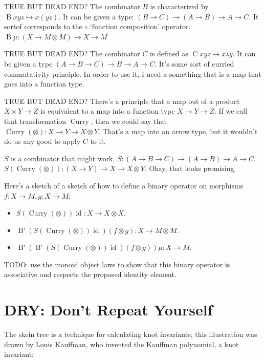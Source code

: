 \documentclass[a4paper]{article}
\begin{document}
TRUE BUT DEAD END? The combinator \(B\) is characterized by \(\mathop{B} x y z \mapsto x (y z)\). 
It can be given a type: \((B \to C) \to (A \to B) \to A \to C\). It sortof corresponds to the \(\circ\) `function composition' operator. \(\mathop{B} \mu : (X \to M \otimes M) \to X \to M\)

TRUE BUT DEAD END? The combinator \(C\) is defined as \(\mathop{C} x y z \mapsto x z y\).
It can be given a type \((A \to B \to C) \to B \to A \to C\). It's some sort of curried commutativity principle. In order to use it, I need a something that is a map that goes into a function type.

TRUE BUT DEAD END? There's a principle that a map out of a product \(X \times Y \to Z\) is equivalent to a map into a function type \(X \to Y \to Z\). If we call that transformation \(\mathop{Curry}\),
then we could say that \( \mathop{Curry} (\otimes) : X \to Y \to X \otimes Y \). That's a map into an arrow type, but it wouldn't do us any good to apply \(C\) to it.

\(S\) is a combinator that might work. \( S : (A \to B \to C) \to (A \to B) \to A \to C\). 
\(S (\mathop{Curry} (\otimes)) : (X \to Y) \to X \to X \otimes Y\). Okay, that looks promising. 

Here's a sketch of a sketch of how to define a binary operator on morphisms \(f : X \to M, g : X \to M\):
\begin{itemize}
    \item \(S (\mathop{Curry} (\otimes)) \mathop{id} : X \to X \otimes X\).
    \item \( \mathop{B'} (S (\mathop{Curry} (\otimes)) \mathop{id}) (f \otimes g) : X \to M \otimes M\).
    \item \( \mathop{B'} (\mathop{B'} (S (\mathop{Curry} (\otimes)) \mathop{id}) (f \otimes g)) \mu : X \to M \).
\end{itemize}

TODO: use the monoid object laws to show that this binary operator is associative and respects the proposed identity element.

\section{DRY: Don't Repeat Yourself}

The skein tree is a technique for calculating knot invariants;
this illustration was drawn by Louis Kauffman, who invented the Kauffman polynomial, a knot invariant:
\end{document}

